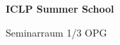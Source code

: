 \documentclass[a4paper]{article}
\begin{document}
\begin{center}
\begin{vsltext}{2.5cm}{4cm}

   \vspace{0.5cm} 

    \textbf{ICLP Summer School} 

    \vspace{1.5cm}

    Seminarraum 1/3 OPG 

\end{vsltext}

\end{center}
\end{document}
